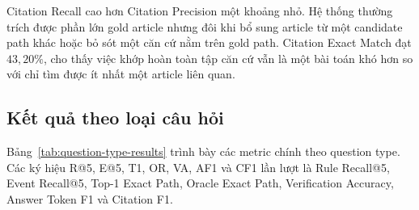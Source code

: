Citation Recall cao hơn Citation Precision một khoảng nhỏ. Hệ thống thường
trích được phần lớn gold article nhưng đôi khi bổ sung article từ một
candidate path khác hoặc bỏ sót một căn cứ nằm trên gold path. Citation
Exact Match đạt \(43{,}20\%\), cho thấy việc khớp hoàn toàn tập căn cứ vẫn là
một bài toán khó hơn so với chỉ tìm được ít nhất một article liên quan.

\subsection{Kết quả theo loại câu hỏi}

Bảng~\ref{tab:question-type-results} trình bày các metric chính theo question
type. Các ký hiệu R@5, E@5, T1, OR, VA, AF1 và CF1 lần lượt là Rule Recall@5,
Event Recall@5, Top-1 Exact Path, Oracle Exact Path, Verification Accuracy,
Answer Token F1 và Citation F1.

